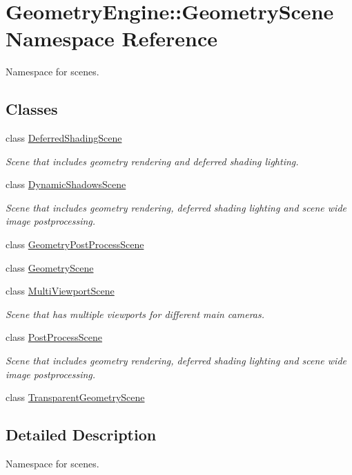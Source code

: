 \hypertarget{namespace_geometry_engine_1_1_geometry_scene}{}\section{Geometry\+Engine\+::Geometry\+Scene Namespace Reference}
\label{namespace_geometry_engine_1_1_geometry_scene}


Namespace for scenes.  


\subsection*{Classes}
\begin{DoxyCompactItemize}
\item 
class \mbox{\hyperlink{class_geometry_engine_1_1_geometry_scene_1_1_deferred_shading_scene}{Deferred\+Shading\+Scene}}
\begin{DoxyCompactList}\small\item\em Scene that includes geometry rendering and deferred shading lighting. \end{DoxyCompactList}\item 
class \mbox{\hyperlink{class_geometry_engine_1_1_geometry_scene_1_1_dynamic_shadows_scene}{Dynamic\+Shadows\+Scene}}
\begin{DoxyCompactList}\small\item\em Scene that includes geometry rendering, deferred shading lighting and scene wide image postprocessing. \end{DoxyCompactList}\item 
class \mbox{\hyperlink{class_geometry_engine_1_1_geometry_scene_1_1_geometry_post_process_scene}{Geometry\+Post\+Process\+Scene}}
\item 
class \mbox{\hyperlink{class_geometry_engine_1_1_geometry_scene_1_1_geometry_scene}{Geometry\+Scene}}
\item 
class \mbox{\hyperlink{class_geometry_engine_1_1_geometry_scene_1_1_multi_viewport_scene}{Multi\+Viewport\+Scene}}
\begin{DoxyCompactList}\small\item\em Scene that has multiple viewports for different main cameras. \end{DoxyCompactList}\item 
class \mbox{\hyperlink{class_geometry_engine_1_1_geometry_scene_1_1_post_process_scene}{Post\+Process\+Scene}}
\begin{DoxyCompactList}\small\item\em Scene that includes geometry rendering, deferred shading lighting and scene wide image postprocessing. \end{DoxyCompactList}\item 
class \mbox{\hyperlink{class_geometry_engine_1_1_geometry_scene_1_1_transparent_geometry_scene}{Transparent\+Geometry\+Scene}}
\end{DoxyCompactItemize}


\subsection{Detailed Description}
Namespace for scenes. 